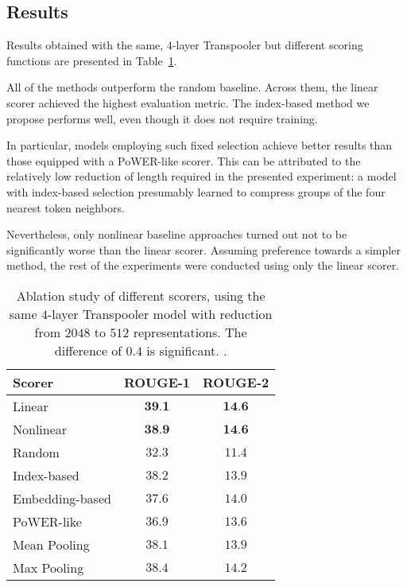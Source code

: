 \documentclass{article}
\begin{document}
\subsection{Results} Results obtained with the same, $4$-layer Transpooler but different scoring functions are presented in Table~\ref{tab:scorer}.

All of the methods outperform the random baseline. Across them, the linear scorer achieved the highest evaluation metric. The index-based method we propose performs well, even though it does not require training.

In particular, models employing such fixed selection achieve better results than those equipped with a PoWER-like scorer. This can be attributed to the relatively low reduction of length required in the presented experiment: a model with index-based selection presumably learned to compress groups of the four nearest token neighbors.

Nevertheless, only nonlinear baseline approaches turned out not to be significantly worse than the linear scorer. Assuming preference towards a simpler method, the rest of the experiments were conducted using only the linear scorer.

\begin{table}[h]
\caption{Ablation study of different scorers, using the same $4$-layer Transpooler model with reduction from $2048$ to $512$ representations. 
The difference of $0.4$ is significant. \citep{doi:10.1113/jphysiol.2012.239376}.}

\label{tab:scorer}
\centering
\begin{tabular}{lcc}
\toprule
Scorer & ROUGE-1 & ROUGE-2 \\ \midrule
Linear     &  $\textbf{39.1}$ & $\textbf{14.6}$ \\
Nonlinear       & $\textbf{38.9}$ & $\textbf{14.6}$ \\        Random         &  $32.3$ & $11.4$ \\        Index-based          & $38.2$ & $13.9$ \\
Embedding-based &  $37.6$ & $14.0$ \\
PoWER-like &  $36.9$ & $13.6$  \\

Mean Pooling &  $38.1$ & $13.9$  \\

Max Pooling &  $38.4$ & $14.2$  \\

\bottomrule
\end{tabular}
\end{table}
\end{document}
